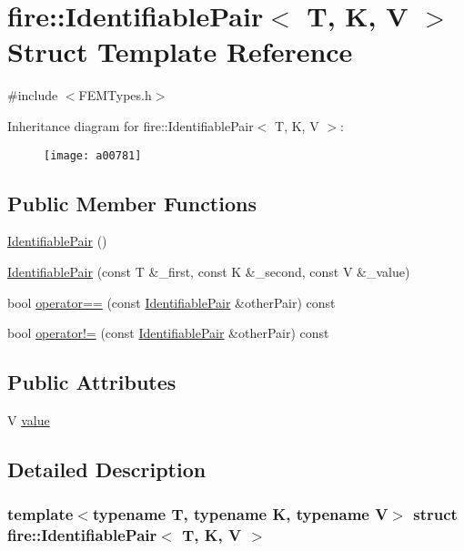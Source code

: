 \hypertarget{a00781}{}\section{fire\+:\+:Identifiable\+Pair$<$ T, K, V $>$ Struct Template Reference}
\label{a00781}


{\ttfamily \#include $<$F\+E\+M\+Types.\+h$>$}

Inheritance diagram for fire\+:\+:Identifiable\+Pair$<$ T, K, V $>$\+:\begin{figure}[H]
\begin{center}
\leavevmode
\texttt{[image: a00781]}
\end{center}
\end{figure}
\subsection*{Public Member Functions}
\begin{DoxyCompactItemize}
\item 
\hyperlink{a00781_a00a1d2e1fc20b2edf8e27dc3158d8826}{Identifiable\+Pair} ()
\item 
\hyperlink{a00781_ade6ddca350a2128a5cab071118c26fee}{Identifiable\+Pair} (const T \&\+\_\+first, const K \&\+\_\+second, const V \&\+\_\+value)
\item 
bool \hyperlink{a00781_a668b15329da55ba90a0232077f7c069c}{operator==} (const \hyperlink{a00781}{Identifiable\+Pair} \&other\+Pair) const
\item 
bool \hyperlink{a00781_ac6a86b2992ee7fa5f868077a73d2667f}{operator!=} (const \hyperlink{a00781}{Identifiable\+Pair} \&other\+Pair) const
\end{DoxyCompactItemize}
\subsection*{Public Attributes}
\begin{DoxyCompactItemize}
\item 
V \hyperlink{a00781_a4aa238990585cb35d1902140ebe6fb9f}{value}
\end{DoxyCompactItemize}


\subsection{Detailed Description}
\subsubsection*{template$<$typename T, typename K, typename V$>$\newline
struct fire\+::\+Identifiable\+Pair$<$ T, K, V $>$}

